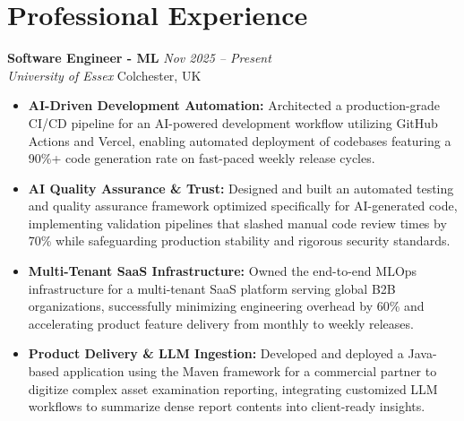 \documentclass[11pt,a4paper]{article}
\begin{document}
\section*{Professional Experience}

\noindent \textbf{Software Engineer - ML} \hfill \textit{Nov 2025 -- Present} \\
\textit{University of Essex} \hfill Colchester, UK
\begin{itemize}
    \item \textbf{AI-Driven Development Automation:} Architected a production-grade CI/CD pipeline for an AI-powered development workflow utilizing GitHub Actions and Vercel, enabling automated deployment of codebases featuring a 90\%+ code generation rate on fast-paced weekly release cycles.
    \item \textbf{AI Quality Assurance \& Trust:} Designed and built an automated testing and quality assurance framework optimized specifically for AI-generated code, implementing validation pipelines that slashed manual code review times by 70\% while safeguarding production stability and rigorous security standards.
    \item \textbf{Multi-Tenant SaaS Infrastructure:} Owned the end-to-end MLOps infrastructure for a multi-tenant SaaS platform serving global B2B organizations, successfully minimizing engineering overhead by 60\% and accelerating product feature delivery from monthly to weekly releases.
    \item \textbf{Product Delivery \& LLM Ingestion:} Developed and deployed a Java-based application using the Maven framework for a commercial partner to digitize complex asset examination reporting, integrating customized LLM workflows to summarize dense report contents into client-ready insights.
\end{itemize}

\vspace{6pt}
\end{document}

